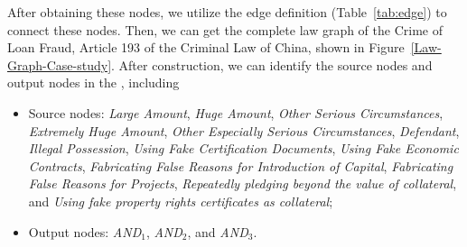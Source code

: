 After obtaining these nodes, we utilize the edge definition (Table~\ref{tab:edge})
to connect these nodes. Then, we can get the complete law graph of the Crime of Loan Fraud, Article 193 of the Criminal Law of China, shown in Figure~\ref{Law-Graph-Case-study}. After construction, we can identify the source nodes and output nodes in the \lawgraph{}, including
\begin{itemize}
    \item Source nodes: \textit{Large Amount}, \textit{Huge Amount}, \textit{Other Serious Circumstances}, \textit{Extremely Huge Amount}, \textit{Other Especially Serious Circumstances}, \textit{Defendant}, \textit{Illegal Possession}, \textit{Using Fake Certification Documents}, \textit{Using Fake Economic Contracts}, \textit{Fabricating False Reasons for Introduction of Capital}, \textit{Fabricating False Reasons for Projects}, \textit{Repeatedly pledging beyond the value of collateral}, and \textit{Using fake property rights certificates as collateral};
    \item Output nodes: \textit{AND$_1$}, \textit{AND$_2$}, and \textit{AND$_3$}.
\end{itemize}




